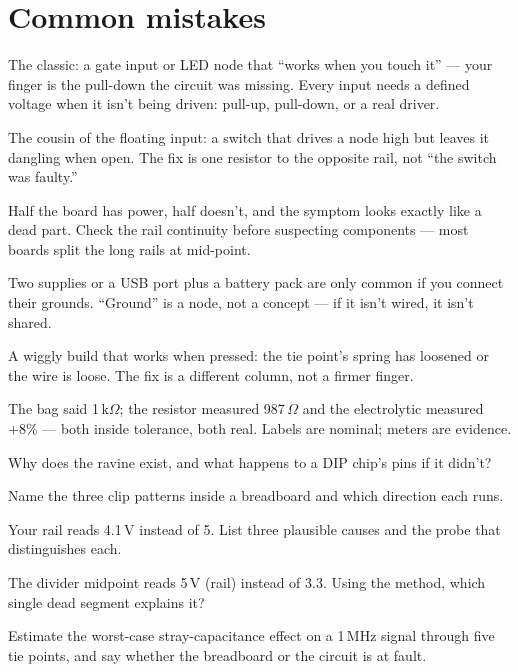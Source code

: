 \section{Common mistakes}\label{sec:cm17}

\begin{tripwire}
The classic: a gate input or LED node that ``works when you touch
it'' --- your finger is the pull-down the circuit was missing. Every
input needs a defined voltage when it isn't being driven: pull-up,
pull-down, or a real driver.
\end{tripwire}
\begin{tripwire}
The cousin of the floating input: a switch that drives a node high
but leaves it dangling when open. The fix is one resistor to the
opposite rail, not ``the switch was faulty.''
\end{tripwire}
\begin{tripwire}
Half the board has power, half doesn't, and the symptom looks
exactly like a dead part. Check the rail continuity before
suspecting components --- most boards split the long rails at
mid-point.
\end{tripwire}
\begin{tripwire}
Two supplies or a USB port plus a battery pack are only common if
you connect their grounds. ``Ground'' is a node, not a concept ---
if it isn't wired, it isn't shared.
\end{tripwire}
\begin{tripwire}
A wiggly build that works when pressed: the tie point's spring has
loosened or the wire is loose. The fix is a different column, not a
firmer finger.
\end{tripwire}
\begin{tripwire}
The bag said 1\,k$\Omega$; the resistor measured 987\,$\Omega$ and
the electrolytic measured $+8\%$ --- both inside tolerance, both
real. Labels are nominal; meters are evidence.
\end{tripwire}

\begin{exercise}[easy]
Why does the ravine exist, and what happens to a DIP chip's pins
if it didn't?
\end{exercise}
\begin{exercise}[easy]
Name the three clip patterns inside a breadboard and which direction
each runs.
\end{exercise}
\begin{exercise}[medium]
Your rail reads 4.1\,V instead of 5. List three plausible causes
and the probe that distinguishes each.
\end{exercise}
\begin{exercise}[medium]
The divider midpoint reads 5\,V (rail) instead of 3.3. Using the
method, which single dead segment explains it?
\end{exercise}
\begin{exercise}[hard]
Estimate the worst-case stray-capacitance effect on a 1\,MHz signal
through five tie points, and say whether the breadboard or the
circuit is at fault.
\end{exercise}

